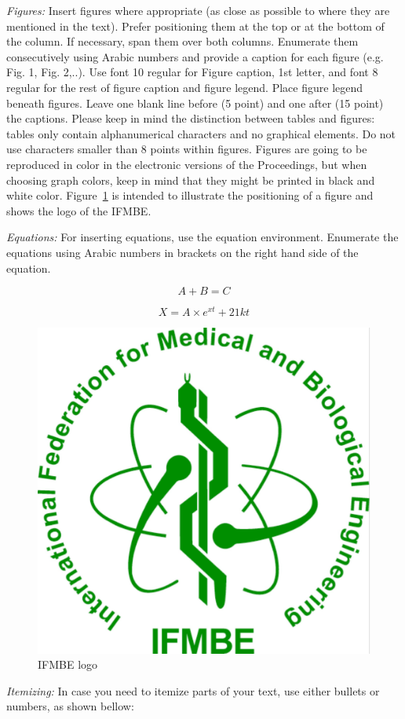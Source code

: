 \documentclass[nouppercase]{ifmbe}
\begin{document}
\textit{Figures:} Insert figures where appropriate (as close as possible
to where they are mentioned in the text). Prefer positioning them at the
top or at the bottom of the column. If necessary, span them over both
columns. Enumerate them consecutively using Arabic numbers and provide a
caption for each figure (e.g. Fig. 1, Fig. 2,..). Use font 10 regular
for Figure caption, 1st letter, and font 8 regular for the rest of
figure caption and figure legend. Place figure legend beneath figures.
Leave one blank line before (5 point) and one after (15 point) the
captions. Please keep in mind the distinction between tables and
figures: tables only contain alphanumerical characters and no graphical
elements. Do not use characters smaller than 8 points within figures.
Figures are going to be reproduced in color in the electronic versions
of the Proceedings, but when choosing graph colors, keep in mind that
they might be printed in black and white color. Figure~\ref{figure1} is
intended to illustrate the positioning of a figure and shows the logo of
the IFMBE.

\textit{Equations:} For inserting equations, use the equation
environment. Enumerate the equations using Arabic numbers in brackets on
the right hand side of the equation.

\begin{equation}
A+B=C
\end{equation}

\begin{equation}
X=A\times e^{xt}+21kt
\end{equation}

\begin{figure}[ht]
      \centering
          \includegraphics[width=0.5\columnwidth]{ifmbe}
      \caption{IFMBE logo}
      \label{figure1}
\end{figure}


\textit{Itemizing:} In case you need to itemize parts of your text, use
either bullets or numbers, as shown bellow:
\end{document}
